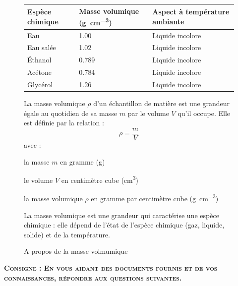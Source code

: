 \documentclass[a4paper,11pt,fleqn]{article}%
\begin{document}
\begin{figure}[h!]
	\begin{minipage}{.48\linewidth}
	\caption{Quelques données}
	\begin{tabular}{|m{.3\linewidth} |m{.2\linewidth} |m{.3\linewidth} |}
	\hline
	Espèce chimique & Masse volumique (\unit{\gram\per\centi\meter\cubed}) & Aspect à température ambiante \\
	\hline
	Eau & \num{1,00} & Liquide incolore\\
	\hline
	Eau salée & \num{1,02} & Liquide incolore\\
	\hline
	Éthanol & \num{0,789} & Liquide incolore\\
	\hline
	Acétone & \num{0,784} & Liquide incolore\\
	\hline
	Glycérol & \num{1,26} & Liquide incolore\\
	\hline
	\end{tabular}
	\end{minipage}\hspace{.04\linewidth}
	\begin{minipage}{.48\linewidth}
	\caption{A propos de la masse volmumique}
	La masse volumique $\rho$ d'un échantillon de matière est une grandeur égale au quotidien de sa masse $m$ par le volume $V$ qu'il occupe.
	Elle est définie par la relation : $$ \rho = \dfrac{m}{V}$$
	avec :
	\begin{itemize**}
		\item la masse $m$ en gramme (\unit{\gram})
		\item le volume $V$ en centimètre cube (\unit{\centi\meter\cubed})
		\item la masse volumique $\rho$ en gramme par centimètre cube (\unit{\gram\per\centi\meter\cubed})
	\end{itemize**}
	La masse volumique est une grandeur qui caractérise une espèce chimique : elle dépend de l'état de l'espèce chimique (gaz, liquide, solide) et de la température.
	\end{minipage}
\end{figure}

\textbf{\textsc{Consigne : En vous aidant des documents fournis et de vos connaissances, répondre aux questions suivantes.}}
\end{document}
